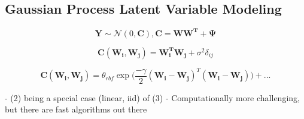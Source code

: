 \documentclass[english, 11pt]{article}\usepackage[]{graphicx}\usepackage[]{color}
\begin{document}
\subsection{Gaussian Process Latent Variable Modeling}

\begin{equation}
\mathbf{Y} \sim  \mathcal{N} (0, \mathbf{C}), \mathbf{C} = \mathbf{WW^T }+ \mathbf{\Psi}
\end{equation}

\begin{equation}
\mathbf{C}(\mathbf{W_i},\mathbf{W_j}) = \mathbf{W_i^T}\mathbf{W_j} + \sigma^2\delta_{ij}
\end{equation}

\begin{equation}
\mathbf{C}(\mathbf{W_i},\mathbf{W_j}) = \theta_{rbf} \exp \Big(\frac{-\gamma}{2}(\mathbf{W_i}-\mathbf{W_j})^{T}(\mathbf{W_i}-\mathbf{W_j})  \Big) + ...
\end{equation}


- (2) being a special case (linear, iid) of (3)
- Computationally more challenging, but there are fast algorithms out there






\end{document}
